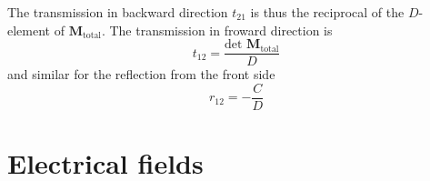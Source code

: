 The transmission in backward direction $t_{21}$ is thus the reciprocal of the $D$-element of $\mathbf{M}_\text{total} $. The transmission in froward direction is 
\begin{equation}
t_{12} = \frac{\text{det } \mathbf{M}_\text{total} }{D}
\end{equation}
and similar for the reflection from the front side
\begin{equation}
r_{12} = - \frac{C }{D}
\end{equation}

%


\section{Electrical fields}


